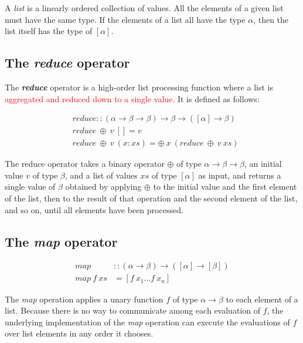 A \textit{list} is a linearly ordered collection of values. All the elements of a given list must have the same type.
If the elements of a list all have the type $\alpha$, then the list itself has the type of $[\alpha]$.

\subsection{The \textit{reduce} operator}

The \textbf{\textit{reduce}} operator is a high-order list processing function where a list is \textcolor{red}{aggregated and reduced down to a single value}.
It is defined as follows:

\begin{align*}
&\textit{reduce} :: (\alpha \rightarrow \beta \rightarrow \beta) \rightarrow \beta \rightarrow ([\alpha] \rightarrow \beta) \\
&\textit{reduce} \ \oplus\ v \ [] = v \\
&\textit{reduce}\ \oplus\ v\ (x:xs) = \oplus \ x\ (\textit{reduce}\ \oplus\ v\ xs)
\end{align*}

The reduce operator takes a binary operator $\oplus$ of type $\alpha \rightarrow \beta \rightarrow \beta$, an initial value $v$ of type $\beta$, and a list of values $xs$ of type $[\alpha]$ as input,
and returns a single value of $\beta$ obtained by applying $\oplus$ to the initial value and the first element of the list,
then to the result of that operation and the second element of the list, and so on, until all elements have been processed.

\subsection{The \textit{map} operator}
\begin{align*}
\textit{map} &:: (\alpha \rightarrow \beta) \rightarrow ([\alpha] \rightarrow [\beta]) \\
\textit{map}\ f \ xs &= \left[ f \ x_1 \ldots f\ x_n\right]
\end{align*}

The \textit{map} operation applies a unary function $f$ of type $\alpha \rightarrow \beta$ to each element of a list.
Because there is no way to communicate among each evaluation of $f$, the underlying implementation of the \textit{map} operation can execute the evaluations of $f$ over list elements in any order it chooses.